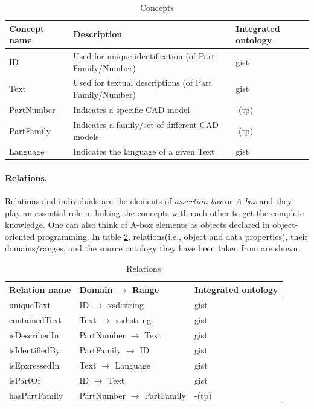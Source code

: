 \begin{table}[H]
	\centering
	\begin{tabular}{|p{}|p{}|p{}|}
		\hline
		\textbf{Concept name} & \textbf{Description} & \textbf{Integrated ontology} \\
		\hline
		ID & Used for unique identification (of Part Family/Number) & gist \\
		\hline
		Text & Used for textual descriptions (of Part Family/Number) & gist \\
		\hline
		PartNumber & Indicates a specific CAD model & -(tp) \\
		\hline
		PartFamily & Indicates a family/set of different CAD models & -(tp) \\
		\hline
		Language & Indicates the language of a given Text & gist \\
		\hline
	\end{tabular}
	\caption{Concepts}
	\label{tab:ontology_concepts}
\end{table}

\paragraph{Relations.}
Relations and individuals are the elements of \textit{assertion box} or \textit{A-box} and they play an 
essential role in linking the concepts with each other to get the complete knowledge. One can also think 
of A-box elements as objects declared in object-oriented programming. In table 
\ref{tab:ontology_relations}, relations(i.e., object and data properties), their domains/ranges, and 
the source ontology they have been taken from are shown.

\begin{table}[H]
	\centering
	\begin{tabular}{|p{}|p{}|p{}|}
		\hline
		\textbf{Relation name} & \textbf{Domain $\rightarrow$ Range} & \textbf{Integrated ontology} \\
		\hline
		uniqueText & ID $\rightarrow$ xsd:string & gist \\
		\hline
		containedText & Text $\rightarrow$ xsd:string & gist \\
		\hline
		isDescribedIn & PartNumber $\rightarrow$ Text & gist \\
		\hline
		isIdentifiedBy & PartFamily $\rightarrow$ ID & gist \\
		\hline
		isEpxressedIn & Text $\rightarrow$ Language & gist \\
		\hline
		isPartOf & ID $\rightarrow$ Text & gist \\
		\hline
		hasPartFamily & PartNumber $\rightarrow$ PartFamily & -(tp) \\
		\hline
	\end{tabular}
	\caption{Relations}
	\label{tab:ontology_relations}
\end{table}

